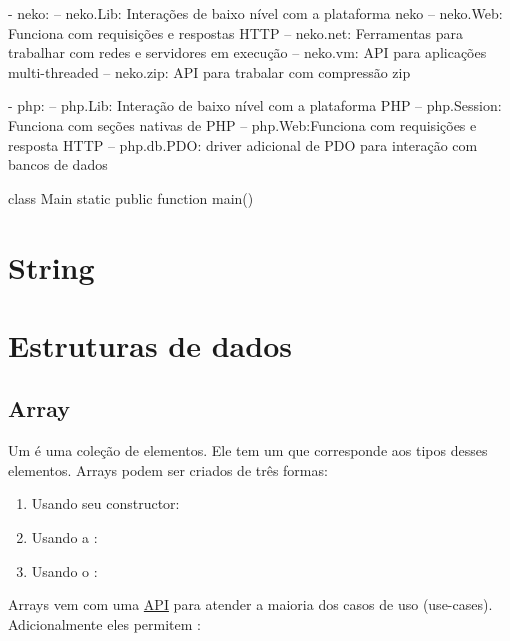 - neko:
 -- neko.Lib: Interações de baixo nível com a plataforma neko
 -- neko.Web: Funciona com requisições e respostas HTTP
 -- neko.net: Ferramentas para trabalhar com redes e servidores em execução -- neko.vm: API para aplicações multi-threaded
 -- neko.zip: API para trabalar com compressão zip

- php:
 -- php.Lib: Interação de baixo nível com a plataforma PHP
 -- php.Session: Funciona com seções nativas de PHP
 -- php.Web:Funciona com requisições e resposta HTTP
 -- php.db.PDO: driver adicional de PDO para interação com bancos de dados

 


class Main {
    static public function main() { }
}


\section{String}
\label{std-String}



\section{Estruturas de dados}
\label{std-ds}

\subsection{Array}
\label{std-Array}

Um  é uma coleção de elementos. Ele tem um   que corresponde aos tipos desses elementos. Arrays podem ser criados de três formas:
\begin{enumerate}
    \item Usando seu constructor: 
    \item Usando a : \expr{[1, 2, 3]}
    \item Usando o : \expr{[for (i in 0...10) if (i \% 2 == 0) i]}
\end{enumerate}

Arrays vem com uma \href{http://api.haxe.org/Array.html}{API} para atender a maioria dos casos de uso (use-cases). Adicionalmente eles permitem :

